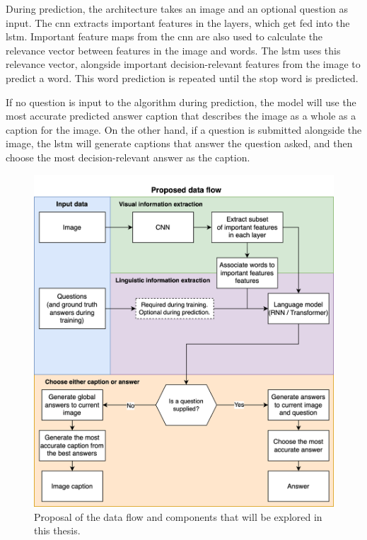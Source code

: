         During prediction, the architecture takes an image and an optional question as input. The \gls{cnn} extracts important features in the layers, which get fed into the \gls{lstm}. Important feature maps from the \gls{cnn} are also used to calculate the relevance vector between features in the image and words. The \gls{lstm} uses this relevance vector, alongside important decision-relevant features from the image to predict a word. This word prediction is repeated until the stop word is predicted. 
        
        If no question is input to the algorithm during prediction, the model will use the most accurate predicted answer caption that describes the image as a whole as a caption for the image. On the other hand, if a question is submitted alongside the image, the \gls{lstm} will generate captions that answer the question asked, and then choose the most decision-relevant answer as the caption. 
        
        
        
        \begin{figure}[htb]
            \centering
            \includegraphics[width=\linewidth]{images/architecture_proposal.png}
            \caption{Proposal of the data flow and components that will be explored in this thesis.}
            \label{fig:architecture_proposal}
        \end{figure}
                
